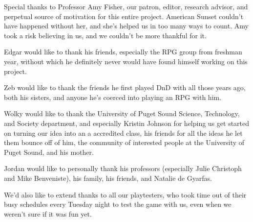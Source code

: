 \documentclass[11pt,fleqn]{book} %
\newenvironment{dedication}
{
   \cleardoublepage
   \thispagestyle{empty}
   \vspace*{\stretch{1}}
   \hfill\begin{minipage}[t]{0.66\textwidth}
   \raggedright
}
{
   \end{minipage}
   \vspace*{\stretch{3}}
   \clearpage
}
\begin{document}
\begin{dedication}
\small Special thanks to Professor Amy Fisher, our patron, editor, research advisor, and perpetual source of motivation for this entire project. American Sunset couldn't have happened without her, and she's helped us in too many ways to count. Amy took a risk believing in us, and we couldn't be more thankful for it.

\hfill

\small Edgar would like to thank his friends, especially the RPG group from freshman year, without which he definitely never would have found himself working on this project.

\hfill

\small Zeb would like to thank the friends he first played DnD with all those years ago, both his sisters, and anyone he's coerced into playing an RPG with him.

\hfill

\small Wolky would like to thank the University of Puget Sound Science, Technology, and Society department, and especially Kristin Johnson for helping us get started on turning our idea into an a
accredited class, his friends for all the ideas he let them bounce off of him, the community of interested people at the University of Puget Sound, and his mother.

\hfill

\small Jordan would like to personally thank his professors (especially Julie Christoph and Mike Benveniste), his family, his friends, and Natalie de Gyarfas.

\hfill

\small We'd also like to extend thanks to all our playtesters, who took time out of their busy schedules every Tuesday night to test the game with us, even when we weren't sure if it was fun yet.

\end{dedication}






























\end{document}
